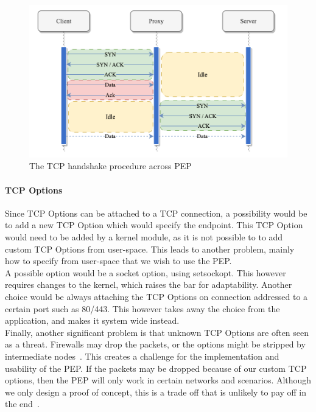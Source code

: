 \documentclass[a4paper,english, 11pt]{report}
\begin{document}
\begin{figure} %
	\centering
	\includegraphics[scale=0.75]{../diagrams/drawio/tcphandshake_primitiv.png}
  	\caption{The TCP handshake procedure across PEP}
  	\label{fig:tcphandshake_primitiv}
\end{figure}

\paragraph{TCP Options}
Since TCP Options can be attached to a TCP connection, a possibility would be to add a new TCP Option which would specify the endpoint. This TCP Option would need to be added by a kernel module, as it is not possible to to add custom TCP Options from user-space. This leads to another problem, mainly how to specify from user-space that we wish to use the PEP.\\

A possible option would be a socket option, using setsockopt. This however requires changes to the kernel, which raises the bar for adaptability. Another choice would be always attaching the TCP Options on connection addressed to a certain port such as 80/443. This however takes away the choice from the application, and makes it system wide instead.\\

Finally, another significant problem is that unknown TCP Options are often seen as a threat. Firewalls may drop the packets, or the options might be stripped by intermediate nodes~\cite{middlebox_interactions}. This creates a challenge for the implementation and usability of the PEP. If the packets may be dropped because of our custom TCP options, then the PEP will only work in certain networks and scenarios. Although we only design a proof of concept, this is a trade off that is unlikely to pay off in the end~\cite{tcp_extendable}.
\end{document}
